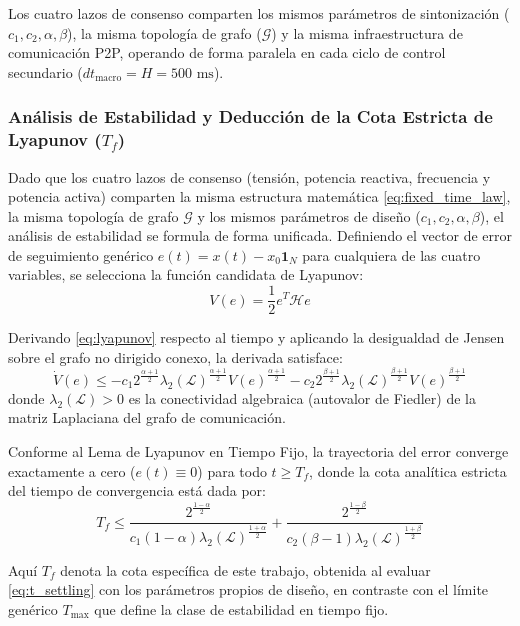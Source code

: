 Los cuatro lazos de consenso comparten los mismos parámetros de sintonización ($c_1, c_2, \alpha, \beta$), la misma topología de grafo ($\mathcal{G}$) y la misma infraestructura de comunicación P2P, operando de forma paralela en cada ciclo de control secundario ($dt_{\text{macro}} = H = 500\text{ ms}$).

\subsubsection{Análisis de Estabilidad y Deducción de la Cota Estricta de Lyapunov (\texorpdfstring{$T_f$}{T\_f})}
Dado que los cuatro lazos de consenso (tensión, potencia reactiva, frecuencia y potencia activa) comparten la misma estructura matemática \eqref{eq:fixed_time_law}, la misma topología de grafo $\mathcal{G}$ y los mismos parámetros de diseño ($c_1, c_2, \alpha, \beta$), el análisis de estabilidad se formula de forma unificada. Definiendo el vector de error de seguimiento genérico $e(t) = x(t) - x_0 \mathbf{1}_N$ para cualquiera de las cuatro variables, se selecciona la función candidata de Lyapunov:
\begin{equation}\label{eq:lyapunov}
V(e) = \frac{1}{2} e^T \mathcal{H} e
\end{equation}

Derivando \eqref{eq:lyapunov} respecto al tiempo y aplicando la desigualdad de Jensen sobre el grafo no dirigido conexo, la derivada satisface:
\[
\dot{V}(e) \le -c_1 2^{\frac{\alpha+1}{2}} \lambda_2(\mathcal{L})^{\frac{\alpha+1}{2}} V(e)^{\frac{\alpha+1}{2}} - c_2 2^{\frac{\beta+1}{2}} \lambda_2(\mathcal{L})^{\frac{\beta+1}{2}} V(e)^{\frac{\beta+1}{2}}
\]
donde $\lambda_2(\mathcal{L}) > 0$ es la conectividad algebraica (autovalor de Fiedler) de la matriz Laplaciana del grafo de comunicación.

Conforme al Lema de Lyapunov en Tiempo Fijo, la trayectoria del error converge exactamente a cero ($e(t) \equiv 0$) para todo $t \ge T_f$, donde la cota analítica estricta del tiempo de convergencia está dada por:
\begin{equation}\label{eq:t_settling}
T_f \le \frac{2^{\frac{1-\alpha}{2}}}{c_1 (1 - \alpha) \lambda_2(\mathcal{L})^{\frac{1+\alpha}{2}}} + \frac{2^{\frac{1-\beta}{2}}}{c_2 (\beta - 1) \lambda_2(\mathcal{L})^{\frac{1+\beta}{2}}}
\end{equation}

Aquí $T_f$ denota la cota específica de este trabajo, obtenida al evaluar \eqref{eq:t_settling} con los parámetros propios de diseño, en contraste con el límite genérico $T_{\max}$ que define la clase de estabilidad en tiempo fijo.

